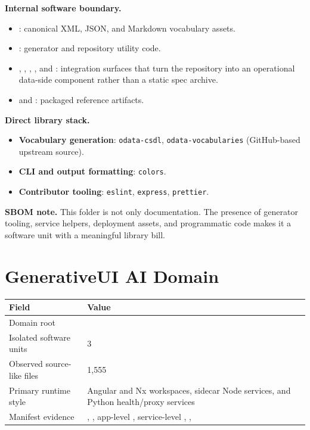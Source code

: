 \documentclass[11pt,a4paper]{article}
\begin{document}
\textbf{Internal software boundary.}
\begin{itemize}[leftmargin=*]
    \item {}: canonical XML, JSON, and Markdown vocabulary assets.
    \item {}: generator and repository utility code.
    \item {}, , , , and : integration surfaces that turn the repository into an operational data-side component rather than a static spec archive.
    \item {} and : packaged reference artifacts.
\end{itemize}

\textbf{Direct library stack.}
\begin{itemize}[leftmargin=*]
    \item \textbf{Vocabulary generation}: \texttt{odata-csdl}, \texttt{odata-vocabularies} (GitHub-based upstream source).
    \item \textbf{CLI and output formatting}: \texttt{colors}.
    \item \textbf{Contributor tooling}: \texttt{eslint}, \texttt{express}, \texttt{prettier}.
\end{itemize}

\textbf{SBOM note.} This folder is not only documentation. The presence of generator tooling, service helpers, deployment assets, and programmatic  code makes it a software unit with a meaningful library bill.

\newpage
\section{GenerativeUI AI Domain}

\begin{tabular}{@{}P{4.2cm}P{9.8cm}@{}}
\toprule
\textbf{Field} & \textbf{Value} \\
\midrule
Domain root &  \\
Isolated software units & 3 \\
Observed source-like files & 1,555 \\
Primary runtime style & Angular and Nx workspaces, sidecar Node services, and Python health/proxy services \\
Manifest evidence & , , app-level , service-level , ,  \\
\bottomrule
\end{tabular}
\end{document}
